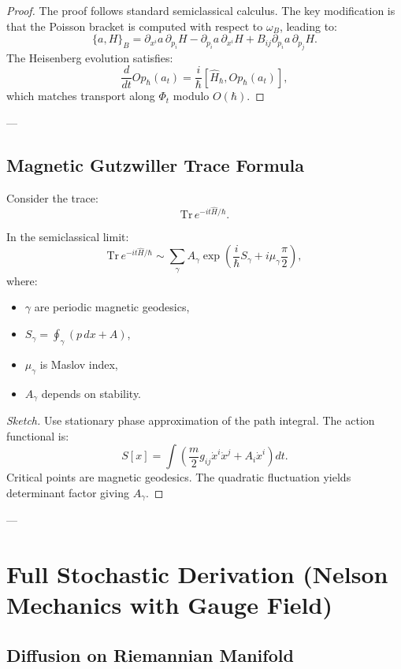 \begin{proof}
The proof follows standard semiclassical calculus. The key modification is that the Poisson bracket is computed with respect to $\omega_B$, leading to:
\[
\{a,H\}_B = \partial_{x^i} a \, \partial_{p_i} H - \partial_{p_i} a \, \partial_{x^i} H + B_{ij} \partial_{p_i} a \, \partial_{p_j} H.
\]
The Heisenberg evolution satisfies:
\[
\frac{d}{dt} Op_\hbar(a_t) = \frac{i}{\hbar}[\hat{H}_\hbar, Op_\hbar(a_t)],
\]
which matches transport along $\Phi_t$ modulo $O(\hbar)$.
\end{proof}

---

\subsection{Magnetic Gutzwiller Trace Formula}

Consider the trace:
\[
\mathrm{Tr}\, e^{-it\hat{H}/\hbar}.
\]

\begin{theorem}
In the semiclassical limit:
\[
\mathrm{Tr}\, e^{-it\hat{H}/\hbar}
\sim
\sum_{\gamma}
A_\gamma
\exp\left(
\frac{i}{\hbar} S_\gamma + i\mu_\gamma \frac{\pi}{2}
\right),
\]
where:
\begin{itemize}
\item $\gamma$ are periodic magnetic geodesics,
\item $S_\gamma = \oint_\gamma (p\,dx + A)$,
\item $\mu_\gamma$ is Maslov index,
\item $A_\gamma$ depends on stability.
\end{itemize}
\end{theorem}

\begin{proof}[Sketch]
Use stationary phase approximation of the path integral. The action functional is:
\[
S[x] = \int \left( \frac{m}{2} g_{ij}\dot{x}^i \dot{x}^j + A_i \dot{x}^i \right) dt.
\]
Critical points are magnetic geodesics. The quadratic fluctuation yields determinant factor giving $A_\gamma$.
\end{proof}

---

\section{Full Stochastic Derivation (Nelson Mechanics with Gauge Field)}

\subsection{Diffusion on Riemannian Manifold}

